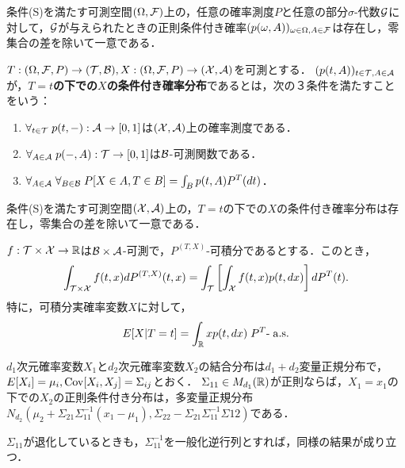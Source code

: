 \documentclass[uplatex,dvipdfmx]{jsreport}
\begin{document}
\begin{theorem}[存在と一意性]
    条件(S)を満たす可測空間$(\Omega,\mathcal{F})$上の，任意の確率測度$P$と任意の部分$\sigma$-代数$\mathcal{G}$に対して，$\mathcal{G}$が与えられたときの正則条件付き確率$(p(\omega,A))_{\omega\in\Omega,A\in\mathcal{F}}$は存在し，零集合の差を除いて一意である．
\end{theorem}

\begin{definition}
    $T:(\Omega,\mathcal{F},P)\to(\mathcal{T},\mathcal{B}),X:(\Omega,\mathcal{F},P)\to(\mathcal{X},\mathcal{A})$を可測とする．
    $(p(t,A))_{t\in\mathcal{T},A\in\mathcal{A}}$が，\textbf{$T=t$の下での$X$の条件付き確率分布}であるとは，次の３条件を満たすことをいう：
    \begin{enumerate}
        \item $\forall_{t\in\mathcal{T}}\;p(t,-):\mathcal{A}\to[0,1]$は$(\mathcal{X},\mathcal{A})$上の確率測度である．
        \item $\forall_{A\in\mathcal{A}}\;p(-,A):\mathcal{T}\to[0,1]$は$\mathcal{B}$-可測関数である．
        \item $\forall_{A\in\mathcal{A}}\;\forall_{B\in\mathcal{B}}\;P[X\in A,T\in B]=\int_Bp(t,A)P^T(dt)$．
    \end{enumerate}
\end{definition}

\begin{theorem}[存在と一意性]
    条件(S)を満たす可測空間$(\mathcal{X},\mathcal{A})$上の，$T=t$の下での$X$の条件付き確率分布は存在し，零集合の差を除いて一意である．
\end{theorem}

\begin{proposition}[Fubiniの類似]
    $f:\mathcal{T}\times\mathcal{X}\to\mathbb{R}$は$\mathcal{B}\times\mathcal{A}$-可測で，$P^{(T,X)}$-可積分であるとする．このとき，
    \[\int_{\mathcal{T}\times\mathcal{X}}f(t,x)dP^{(T,X)}(t,x)=\int_{\mathcal{T}}\left[\int_{\mathcal{X}} f(t,x)p(t,dx)\right]dP^T(t).\]
    特に，可積分実確率変数$X$に対して，
    \[E[X|T=t]=\int_{\mathbb{R}} xp(t,dx)\;P^T\text{-}\;\mathrm{a.s.}\]
\end{proposition}

\begin{proposition}[多変量正規分布の条件付き分布は再び多変量正規分布となる]
    $d_1$次元確率変数$X_1$と$d_2$次元確率変数$X_2$の結合分布は$d_1+d_2$変量正規分布で，$E[X_i]=\mu_i,\mathrm{Cov}[X_i,X_j]=\Sigma_{ij}$とおく．
    $\Sigma_{11}\in M_{d_1}(\mathbb{R})$が正則ならば，$X_1=x_1$の下での$X_2$の正則条件付き分布は，多変量正規分布$N_{d_2}(\mu_2+\Sigma_{21}\Sigma_{11}^{-1}(x_1-\mu_1),\Sigma_{22}-\Sigma_{21}\Sigma^{-1}_{11}\Sigma{12})$である．
\end{proposition}
\begin{remark}
    $\Sigma_{11}$が退化しているときも，$\Sigma^{-1}_{11}$を一般化逆行列とすれば，同様の結果が成り立つ．
\end{remark}
\end{document}
